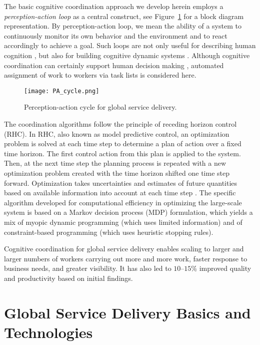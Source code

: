 \documentclass[10pt,journal,cspaper,compsoc]{IEEEtran}
\begin{document}
The basic cognitive coordination approach we develop herein employs a \emph{perception-action loop} as a central 
construct, see Figure~\ref{fig:PA_cycle} for a block diagram representation.  
By perception-action loop, we mean the ability of a system to continuously monitor its own behavior
and the environment and to react accordingly to achieve a goal.  Such loops are not only useful for describing 
human cognition \cite{KlyubinPN2007}, but also for building cognitive dynamic systems \cite{Haykin2012,Haykin2014,HaykinF2014}.
Although cognitive coordination can certainly support human decision making \cite{OppenheimBRC2011a},
automated assignment of work to workers via task lists is considered here.  

\begin{figure}
  \centering
  \texttt{[image: PA\_cycle.png]}
  \caption{Perception-action cycle for global service delivery.}
  \label{fig:PA_cycle}
\end{figure}

The coordination algorithms follow the principle of receding horizon control (RHC).  In RHC, also known as model predictive control, 
an optimization problem is solved at each time step to determine a plan of action over a fixed time horizon.  The 
first control action from this plan is applied to the system. Then, at the next time step the planning process is 
repeated with a new optimization problem created with the time horizon shifted one time step forward.  Optimization 
takes uncertainties and estimates of future quantities based on available information into account at each time step \cite{MattingleyWB2011}.  
The specific algorithm developed for computational efficiency in optimizing the large-scale system is based on a
Markov decision process (MDP) formulation, which yields a mix of myopic dynamic programming (which uses limited 
information) and of constraint-based programming (which uses heuristic stopping rules).

Cognitive coordination for global service delivery enables scaling to larger and larger numbers
of workers carrying out more and more work, faster response to business needs, and greater visibility.  It has also 
led to $10$--$15$\% improved quality and productivity based on initial findings.

\section{Global Service Delivery Basics and Technologies}
\end{document}
